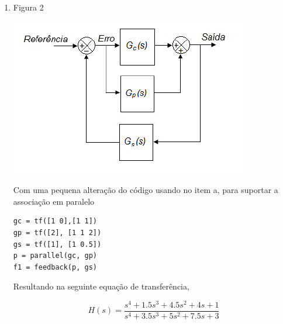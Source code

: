 \documentclass[paper=a4, fontsize=11pt]{article}
\begin{document}
\begin{list}{\textbf{Questão .}}{
\setlength{\labelwidth}{-2mm} \setlength{\parsep}{0mm}
\setlength{\topsep}{0mm} \setlength{\leftmargin}{0mm}}
\begin{enumerate}
            Usando os comandos $series$ e $feedback$ é possível criar a função
            de transferência, para tanto o código abaixo foi construído,

            \begin{lstlisting}
gc = tf([1 0],[1 1])
gp = tf([2], [1 1 2])
gs = tf([1], [1 0.5])
s = series(gc, gp)
f = feedback(s, gs)
             \end{lstlisting}

            Resultando na seguinte equação de transferência,

            $$
            H(s) = \frac{2 s^2 + s}{s^4 + 2.5 s^3 + 4 s^2 + 5.5 s + 1}
            $$


        \item
             Figura 2
            \begin{center}
            \includegraphics[scale=0.5]{fig5b.png}
            \end{center}
            
            Com uma pequena alteração do código usando no item a, para suportar
            a associação em paralelo

             \begin{lstlisting}
gc = tf([1 0],[1 1])
gp = tf([2], [1 1 2])
gs = tf([1], [1 0.5])
p = parallel(gc, gp)
f1 = feedback(p, gs)
             \end{lstlisting}

             Resultando na seguinte equação de transferência,

             $$
                H(s) = \frac{s^4 + 1.5 s^3 + 4.5 s^2 + 4 s + 1}{s^4 + 3.5 s^3 + 5 s^2 + 7.5 s + 3}
             $$


    \end{enumerate}




\end{list}
\end{document}
